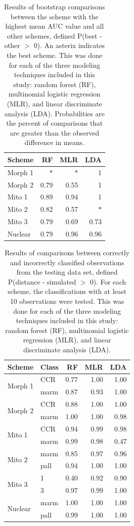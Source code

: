 \documentclass[12pt,letterpaper]{article}
\begin{document}
\begin{table}[ht]
  \centering
  \caption{Results of bootstrap comparisons between the scheme with the highest mean AUC value and all other schemes, defined P(best - other \(>\) 0). An asterix indicates the best scheme. This was done for each of the three modeling techniques included in this study: random forest (RF), multinomial logistic regression (MLR), and linear discriminate analysis (LDA). Probabilities are the percent of comparisons that are greater than the observed difference in means.}
  \begin{tabular}{ l r r r }
    \hline
    Scheme & RF & MLR & LDA \\
    \hline
    \hline
    Morph 1 & \(\ast\) & \(\ast\) & 1 \\
    Morph 2 & 0.79 & 0.55 & 1 \\
    Mito 1 & 0.89 & 0.94 & 1 \\ 
    Mito 2 & 0.82 & 0.57 & \(\ast\) \\ 
    Mito 3 & 0.79 & 0.69 & 0.73 \\ 
    Nuclear & 0.79 & 0.96 & 0.96 \\ 
    \hline
  \end{tabular}
  \label{tab:gen_tests}
\end{table}

\begin{table}[ht]
  \centering
  \caption{Results of comparisons between correctly and incorrectly classified observations from the testing data set, defined P(distance - simulated \(>\) 0). For each scheme, the classifications with at least 10 observations were tested. This was done for each of the three modeling techniques included in this study: random forest (RF), multinomial logistic regression (MLR), and linear discriminate analysis (LDA).}
  \begin{tabular}{ l | l r r r }
    \hline
    Scheme & Class & RF & MLR & LDA \\
    \hline
    \hline
    \multirow{2}{*}{Morph 1} & CCR & 0.77 & 1.00 & 1.00 \\ 
    & marm & 0.87 & 0.93 & 1.00 \\ 
    \hline
    \multirow{2}{*}{Morph 2} & CCR & 0.88 & 1.00 & 1.00 \\ 
    & marm & 1.00 & 1.00 & 0.98 \\ 
    \hline
    \multirow{2}{*}{Mito 1} & CCR & 0.94 & 0.99 & 0.98 \\ 
    & marm & 0.99 & 0.98 & 0.47 \\ 
    \hline
    \multirow{2}{*}{Mito 2} & marm & 0.85 & 0.97 & 0.96 \\ 
    & pall & 0.94 & 1.00 & 1.00 \\ 
    \hline
    \multirow{2}{*}{Mito 3} & 1 & 0.40 & 0.92 & 0.90 \\ 
    & 3 & 0.97 & 0.99 & 1.00 \\ 
    \hline
    \multirow{2}{*}{Nuclear} & marm & 1.00 & 1.00 & 1.00 \\ 
    & pall & 0.99 & 1.00 & 1.00 \\ 
    \hline
  \end{tabular}
  \label{tab:miss_tests}
\end{table}
\end{document}

